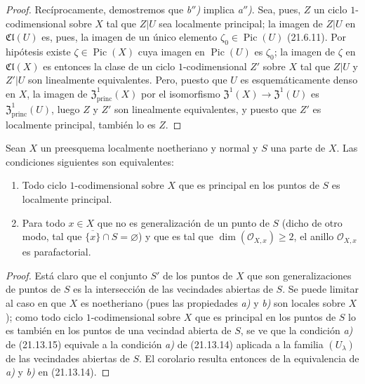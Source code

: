 \begin{proof}
Recíprocamente, demostremos que \emph{b$''$)} implica \emph{a$''$)}. Sea, pues, $Z$ un ciclo
$1$-codimensional sobre $X$ tal que $Z|U$ sea localmente principal; la imagen de $Z|U$
en $\mathfrak{Cl}(U)$ es, pues, la imagen de un único elemento
$\zeta_0\in\operatorname{Pic}(U)$ (21.6.11). Por hipótesis existe
$\zeta\in\operatorname{Pic}(X)$ cuya imagen en $\operatorname{Pic}(U)$ es
$\zeta_0$; la imagen de $\zeta$ en $\mathfrak{Cl}(X)$ es entonces la clase de un ciclo
$1$-codimensional $Z'$ sobre $X$ tal que $Z|U$ y $Z'|U$ son linealmente
equivalentes. Pero, puesto que $U$ es esquemáticamente denso en $X$, la imagen de
$\mathfrak{Z}^1_{\mathrm{princ}}(X)$ por el isomorfismo
$\mathfrak{Z}^1(X)\to\mathfrak{Z}^1(U)$ es $\mathfrak{Z}^1_{\mathrm{princ}}(U)$, luego $Z$
y $Z'$ son linealmente equivalentes, y puesto que $Z'$ es localmente principal, también lo
es $Z$.
\end{proof}

\begin{corollary}[21.13.15]
\label{IV.21.13.15}
Sean $X$ un preesquema localmente noetheriano y normal y $S$ una parte de $X$. Las
condiciones siguientes son equivalentes:
\begin{enumerate}[label=\emph{\alph*)}]
  \item Todo ciclo $1$-codimensional sobre $X$ que es principal en los puntos de $S$ es
  localmente principal.
  \item Para todo $x\in X$ que no es generalización de un punto de $S$ \textup{(}dicho de otro
  modo, tal que $\overline{\{x\}}\cap S=\varnothing$\textup{)} y que es tal que
  $\dim(\mathcal O_{X,x})\geq2$, el anillo $\mathcal O_{X,x}$ es parafactorial.
\end{enumerate}
\end{corollary}

\begin{proof}
Está claro que el conjunto $S'$ de los puntos de $X$ que son generalizaciones de puntos de $S$ es
la intersección de las vecindades abiertas de $S$. Se puede limitar al caso en que $X$ es
noetheriano (pues las propiedades \emph{a)} y \emph{b)} son locales sobre $X$); como todo ciclo
$1$-codimensional sobre $X$ que es principal en los puntos de $S$ lo es también en los puntos
de una vecindad abierta de $S$, se ve que la condición \emph{a)} de (21.13.15) equivale a
la condición \emph{a)} de (21.13.14) aplicada a la familia $(U_\lambda)$ de las vecindades
abiertas de $S$. El corolario resulta entonces de la equivalencia de \emph{a)} y \emph{b)} en
(21.13.14).
\end{proof}

